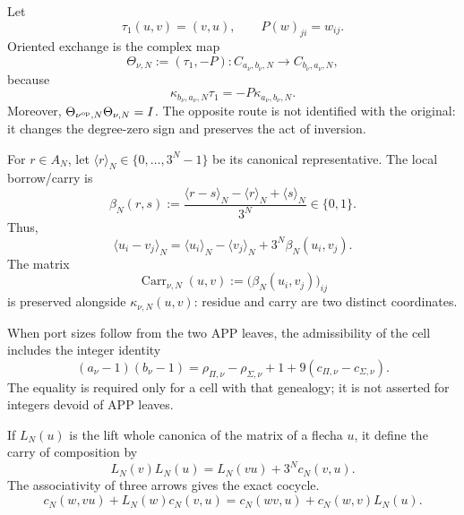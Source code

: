 Let
\[
 \tau_1(u,v)=(v,u),
 \qquad
 P(w)_{ji}=w_{ij}.
\]
Oriented exchange is the complex map
\begin{equation}\label{eq:pdfv2-coh-theta}
 \Theta_{\nu,N}:=(\tau_1,-P):
 C_{a_\nu,b_\nu,N}\longrightarrow C_{b_\nu,a_\nu,N},
\end{equation}
because
\begin{equation}\label{eq:pdfv2-coh-orientation}
 \kappa_{b_\nu,a_\nu,N}\tau_1
 =-P\kappa_{a_\nu,b_\nu,N}.
\end{equation}
Moreover,
\(\Theta_{\nu^{\rm op},N}\Theta_{\nu,N}=I\). The opposite route is not
identified with the original: it changes the degree-zero sign and preserves the act
of inversion.

For \(r\in A_N\), let
\(\langle r\rangle_N\in\{0,\ldots,3^N-1\}\) be its canonical representative. The
local borrow/carry is
\begin{equation}\label{eq:pdfv2-coh-beta}
 \beta_N(r,s):=
 \frac{\langle r-s\rangle_N-\langle r\rangle_N+\langle s\rangle_N}
 {3^N}\in\{0,1\}.
\end{equation}
Thus,
\begin{equation}\label{eq:pdfv2-coh-carry-cell}
 \langle u_i-v_j\rangle_N
 =\langle u_i\rangle_N-\langle v_j\rangle_N
  +3^N\beta_N(u_i,v_j).
\end{equation}
The matrix
\[
 \operatorname{Carr}_{\nu,N}(u,v)
 :=\bigl(\beta_N(u_i,v_j)\bigr)_{ij}
\]
is preserved alongside \(\kappa_{\nu,N}(u,v)\): residue and carry are two
distinct coordinates.

When port sizes follow from the two APP leaves, the admissibility
of the cell includes the integer identity
\begin{equation}\label{eq:pdfv2-coh-app-defect}
 (a_\nu-1)(b_\nu-1)
 =\rho_{\Pi,\nu}-\rho_{\Sigma,\nu}+1
  +9(c_{\Pi,\nu}-c_{\Sigma,\nu}).
\end{equation}
The equality is required only for a cell with that genealogy; it is not asserted
for integers devoid of APP leaves.

If \(L_N(u)\) is the lift whole canonica of the matrix of a flecha
\(u\), it define the carry of composition by
\begin{equation}\label{eq:pdfv2-coh-carry-composition}
 L_N(v)L_N(u)=L_N(vu)+3^N c_N(v,u).
\end{equation}
The associativity of three arrows gives the exact cocycle.
\begin{equation}\label{eq:pdfv2-coh-carry-cocycle}
 c_N(w,vu)+L_N(w)c_N(v,u)
 =c_N(wv,u)+c_N(w,v)L_N(u).
\end{equation}

